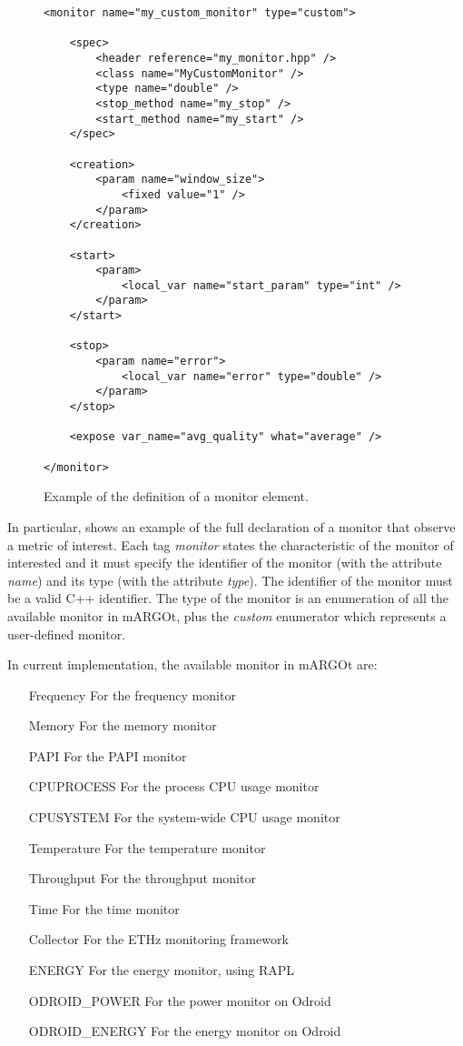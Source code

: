 \begin{figure}
\lstset{language=XML}
\begin{lstlisting}
<monitor name="my_custom_monitor" type="custom">

	<spec>
		<header reference="my_monitor.hpp" />
		<class name="MyCustomMonitor" />
		<type name="double" />
		<stop_method name="my_stop" />
		<start_method name="my_start" />
	</spec>

	<creation>
		<param name="window_size">
			<fixed value="1" />
		</param>
	</creation>

	<start>
		<param>
			<local_var name="start_param" type="int" />
		</param>
	</start>

	<stop>
		<param name="error">
			<local_var name="error" type="double" />
		</param>
	</stop>

	<expose var_name="avg_quality" what="average" />

</monitor>
\end{lstlisting}
\caption{Example of the definition of a monitor element.}
\label{code:monitor_xml}
\end{figure}


In particular,  shows an example of the full declaration of a monitor that observe a metric of interest.
Each tag \textit{monitor} states the characteristic of the monitor of interested and it must specify the identifier of the monitor (with the attribute \textit{name}) and its type (with the attribute \textit{type}).
The identifier of the monitor must be a valid C++ identifier.
The type of the monitor is an enumeration of all the available monitor in mARGOt, plus the \textit{custom} enumerator which represents a user-defined monitor.


In current implementation, the available monitor in mARGOt are:
\begin{enumerate}
	\item[Frequency] For the frequency monitor
	\item[Memory] For the memory monitor
	\item[PAPI] For the PAPI monitor
	\item[CPUPROCESS] For the process CPU usage monitor
	\item[CPUSYSTEM] For the system-wide CPU usage monitor
	\item[Temperature] For the temperature monitor
	\item[Throughput] For the throughput monitor
	\item[Time] For the time monitor
	\item[Collector] For the ETHz monitoring framework
	\item[ENERGY] For the energy monitor, using RAPL
	\item[ODROID\_POWER] For the power monitor on Odroid
	\item[ODROID\_ENERGY] For the energy monitor on Odroid
\end{enumerate}



